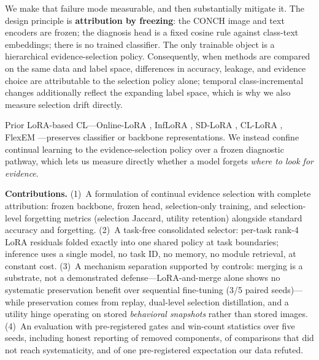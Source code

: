 \documentclass{article}
\begin{document}
We make that failure mode measurable, and then substantially mitigate it. The design principle is \textbf{attribution by freezing}: the CONCH image and text encoders \cite{lu2024conch} are frozen; the diagnosis head is a fixed cosine rule against class-text embeddings; there is no trained classifier. The only trainable object is a hierarchical evidence-selection policy. Consequently, when methods are compared on the same data and label space, differences in accuracy, leakage, and evidence choice are attributable to the selection policy alone; temporal class-incremental changes additionally reflect the expanding label space, which is why we also measure selection drift directly.

Prior LoRA-based CL---Online-LoRA \cite{wei2025onlinelora}, InfLoRA \cite{liang2024inflora}, SD-LoRA \cite{wu2025sdlora}, CL-LoRA \cite{he2025cllora}, FlexEM \cite{chen2026flexem}---preserves classifier or backbone representations. We instead confine continual learning to the evidence-selection policy over a frozen diagnostic pathway, which lets us measure directly whether a model forgets \emph{where to look for evidence}.

\textbf{Contributions.}
(1)~A formulation of continual evidence selection with complete attribution: frozen backbone, frozen head, selection-only training, and selection-level forgetting metrics (selection Jaccard, utility retention) alongside standard accuracy and forgetting.
(2)~A task-free consolidated selector: per-task rank-4 LoRA residuals folded exactly into one shared policy at task boundaries; inference uses a single model, no task ID, no memory, no module retrieval, at constant cost.
(3)~A mechanism separation supported by controls: merging is a substrate, not a demonstrated defense---LoRA-and-merge alone shows no systematic preservation benefit over sequential fine-tuning (3/5 paired seeds)---while preservation comes from replay, dual-level selection distillation, and a utility hinge operating on stored \emph{behavioral snapshots} rather than stored images.
(4)~An evaluation with pre-registered gates and win-count statistics over five seeds, including honest reporting of removed components, of comparisons that did not reach systematicity, and of one pre-registered expectation our data refuted.
\end{document}
